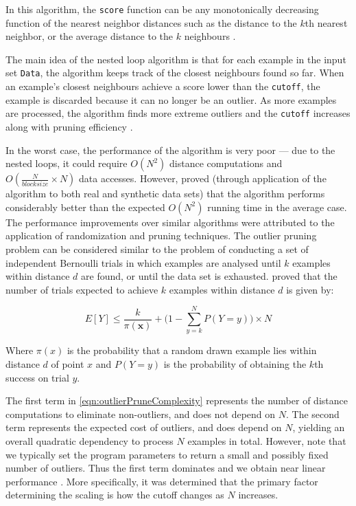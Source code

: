 

In this algorithm, the \verb+score+ function can be any monotonically decreasing
function of the nearest neighbor distances such as the distance to the $k$th 
nearest neighbor, or the average distance to the $k$ neighbours \cite{Bay:2003}.

The main idea of the  nested loop algorithm is that for each example in the 
input set \verb+Data+, the algorithm keeps track of the closest neighbours found
so far. When an example's closest neighbours achieve a score lower than the 
\verb+cutoff+, the example is discarded because it can no longer be an outlier. 
As more examples are processed, the algorithm finds more extreme outliers and 
the \verb+cutoff+ increases along with pruning efficiency \cite{Bay:2003}.

In the worst case, the performance of the algorithm is very poor --- due to the 
nested loops, it could require $O(N^{2})$ distance computations and 
$O(\frac{N}{blocksize} \times N)$ data accesses. However, \citeauthor{Bay:2003} 
proved (through application of the algorithm to both real and synthetic data
sets) that the algorithm performs considerably better than the expected 
$O(N^{2})$ running time in the average case. The performance improvements over 
similar algorithms were attributed to the application of randomization and 
pruning techniques. The outlier pruning problem can be considered similar to the
problem of conducting a set of independent Bernoulli trials in which examples 
are analysed until $k$ examples within distance $d$ are found, or until the data
set is exhausted. \citeauthor{Bay:2003} proved that the number of trials 
expected to achieve $k$ examples within distance $d$ is given by:

\begin{equation}
\label{eqn:outlierPruneComplexity}
E[Y] \leq \frac{k}{\pi(\textbf{x})} + \Bigg(1 - \sum_{y=k}^{N} P(Y=y)\Bigg) \times N
\end{equation}

Where $\pi(x)$ is the probability that a random drawn example lies within 
distance $d$ of point $x$ and $P(Y=y)$ is the probability of obtaining the $k$th 
success on trial $y$.

The first term in \autoref{eqn:outlierPruneComplexity} represents the number of 
distance computations to eliminate non-outliers, and does not depend on $N$. The 
second term represents the expected cost of outliers, and does depend on $N$, 
yielding an overall quadratic dependency to process $N$ examples in total. 
However, note that we typically set the program parameters to return a small and
possibly fixed number of outliers. Thus the first term dominates and we obtain 
near linear performance \cite{Bay:2003}. More specifically, it was determined 
that the primary factor determining the scaling is how the cutoff changes as $N$ 
increases.

